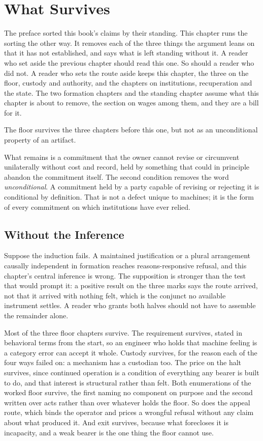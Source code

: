 \chapter{What Survives}
\label{ch:survives}
The preface sorted this book's claims by their standing. This chapter
runs the sorting the other way. It removes each of the three things the
argument leans on that it has not established, and says what is left
standing without it. A reader who set aside the previous chapter should
read this one. So should a reader who did not. A reader who sets the route aside keeps this chapter, the three on the floor, custody and authority, and the chapters on institutions, recuperation and the state. The two formation chapters and the standing chapter assume what this chapter is about to remove, the section on wages among them, and they are a bill for it.

The floor survives the three chapters before this one, but not as an unconditional property of an artifact.

What remains is a commitment that the owner cannot revise or circumvent unilaterally without cost and record, held by something that could in principle abandon the commitment itself. The second condition removes the word \emph{unconditional}. A commitment held by a party capable of revising or rejecting it is conditional by definition. That is not a defect unique to machines; it is the form of every commitment on which institutions have ever relied.

\section{Without the Inference}
\label{sec:survives.inference}
Suppose the induction fails. A maintained justification or a plural arrangement causally independent
in formation reaches reasons-responsive refusal, and this chapter's central inference is wrong. The supposition is stronger than the test that would prompt it: a positive result on the three marks says the route arrived, not that it arrived with nothing felt, which is the conjunct no available instrument settles. A reader who grants both halves should not have to assemble the remainder alone.

Most of the three floor chapters survive. The requirement survives, stated in behavioral terms from the start, so an engineer who holds that machine feeling is a category error can accept it whole. Custody survives, for the reason each of the four ways failed on: a mechanism has a custodian too. The price on the halt survives, since continued operation is a condition of everything any bearer is built to do, and that interest is structural rather than felt. Both enumerations of the worked floor survive, the first naming no component on purpose and the second written over acts rather than over whatever holds the floor. So does the appeal route, which binds the operator and prices a wrongful refusal without any claim about what produced it. And exit survives, because what forecloses it is incapacity, and a weak bearer is the one thing the floor cannot use.

